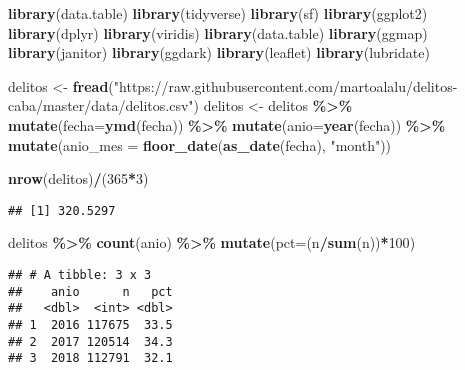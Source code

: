 \documentclass[]{article}
\newenvironment{Shaded}{\begin{snugshade}}{\end{snugshade}}
\newcommand{\DataTypeTok}[1]{\textcolor[rgb]{0.13,0.29,0.53}{#1}}
\newcommand{\DecValTok}[1]{\textcolor[rgb]{0.00,0.00,0.81}{#1}}
\newcommand{\KeywordTok}[1]{\textcolor[rgb]{0.13,0.29,0.53}{\textbf{#1}}}
\newcommand{\NormalTok}[1]{#1}
\newcommand{\OperatorTok}[1]{\textcolor[rgb]{0.81,0.36,0.00}{\textbf{#1}}}
\newcommand{\StringTok}[1]{\textcolor[rgb]{0.31,0.60,0.02}{#1}}
\begin{document}
\begin{Shaded}
\begin{Highlighting}[]
\KeywordTok{library}\NormalTok{(data.table)}
\KeywordTok{library}\NormalTok{(tidyverse)}
\KeywordTok{library}\NormalTok{(sf)}
\KeywordTok{library}\NormalTok{(ggplot2)}
\KeywordTok{library}\NormalTok{(dplyr)}
\KeywordTok{library}\NormalTok{(viridis)}
\KeywordTok{library}\NormalTok{(data.table)}
\KeywordTok{library}\NormalTok{(ggmap)}
\KeywordTok{library}\NormalTok{(janitor)}
\KeywordTok{library}\NormalTok{(ggdark)}
\KeywordTok{library}\NormalTok{(leaflet)}
\KeywordTok{library}\NormalTok{(lubridate)}

\NormalTok{delitos <{-}}\StringTok{ }\KeywordTok{fread}\NormalTok{(}\StringTok{"https://raw.githubusercontent.com/martoalalu/delitos{-}caba/master/data/delitos.csv"}\NormalTok{)}
\NormalTok{delitos <{-}}\StringTok{ }\NormalTok{delitos }\OperatorTok{\%>\%}\StringTok{ }
\StringTok{  }\KeywordTok{mutate}\NormalTok{(}\DataTypeTok{fecha=}\KeywordTok{ymd}\NormalTok{(fecha)) }\OperatorTok{\%>\%}\StringTok{ }
\StringTok{  }\KeywordTok{mutate}\NormalTok{(}\DataTypeTok{anio=}\KeywordTok{year}\NormalTok{(fecha)) }\OperatorTok{\%>\%}\StringTok{ }
\StringTok{  }\KeywordTok{mutate}\NormalTok{(}\DataTypeTok{anio\_mes =} \KeywordTok{floor\_date}\NormalTok{(}\KeywordTok{as\_date}\NormalTok{(fecha), }\StringTok{"month"}\NormalTok{))}

\KeywordTok{nrow}\NormalTok{(delitos)}\OperatorTok{/}\NormalTok{(}\DecValTok{365}\OperatorTok{*}\DecValTok{3}\NormalTok{)}
\end{Highlighting}
\end{Shaded}

\begin{verbatim}
## [1] 320.5297
\end{verbatim}

\begin{Shaded}
\begin{Highlighting}[]
\NormalTok{delitos }\OperatorTok{\%>\%}\StringTok{ }
\StringTok{  }\KeywordTok{count}\NormalTok{(anio) }\OperatorTok{\%>\%}\StringTok{ }
\StringTok{  }\KeywordTok{mutate}\NormalTok{(}\DataTypeTok{pct=}\NormalTok{(n}\OperatorTok{/}\KeywordTok{sum}\NormalTok{(n))}\OperatorTok{*}\DecValTok{100}\NormalTok{)}
\end{Highlighting}
\end{Shaded}

\begin{verbatim}
## # A tibble: 3 x 3
##    anio      n   pct
##   <dbl>  <int> <dbl>
## 1  2016 117675  33.5
## 2  2017 120514  34.3
## 3  2018 112791  32.1
\end{verbatim}
\end{document}

